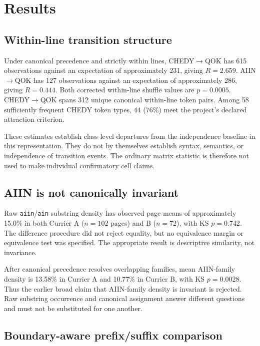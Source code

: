 \documentclass[11pt]{article}
\begin{document}
\section{Results}

\subsection{Within-line transition structure}

Under canonical precedence and strictly within lines, CHEDY$\to$QOK has
615 observations against an expectation of approximately 231, giving
$R=2.659$. AIIN$\to$QOK has 127 observations against an expectation of
approximately 286, giving $R=0.444$. Both corrected within-line shuffle
values are $p=0.0005$. CHEDY$\to$QOK spans 312 unique canonical within-line
token pairs. Among 58 sufficiently frequent CHEDY token types, 44 (76\%)
meet the project's declared attraction criterion.

These estimates establish class-level departures from the independence
baseline in this representation. They do not by themselves establish syntax,
semantics, or independence of transition events. The ordinary matrix
statistic is therefore not used to make individual confirmatory cell claims.

\subsection{AIIN is not canonically invariant}

Raw \texttt{aiin}/\texttt{ain} substring density has observed page means of
approximately 15.0\% in both Currier A ($n=102$ pages) and B ($n=72$), with
KS $p=0.742$. The difference procedure did not reject equality, but no
equivalence margin or equivalence test was specified. The appropriate result
is descriptive similarity, not invariance.

After canonical precedence resolves overlapping families, mean AIIN-family
density is 13.58\% in Currier A and 10.77\% in Currier B, with KS
$p=0.0028$. Thus the earlier broad claim that AIIN-family density is invariant
is rejected. Raw substring occurrence and canonical assignment answer
different questions and must not be substituted for one another.

\subsection{Boundary-aware prefix/suffix comparison}
\end{document}
